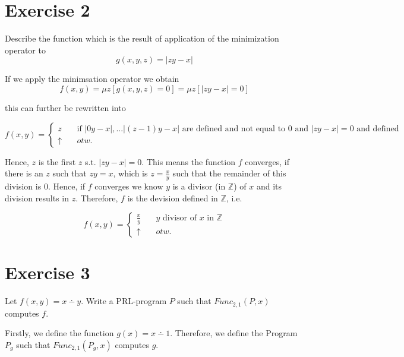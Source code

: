 \documentclass[11pt,a4paper]{article}
\begin{document}
\section*{Exercise 2}
Describe the function which is the result of application of the minimization operator to
\begin{equation*}
g(x,y,z) = |zy-x|
\end{equation*}

If we apply the minimsation operator we obtain
\begin{equation*}
f(x,y)= \mu z [g(x,y,z) = 0] = \mu z [|zy-x| = 0]
\end{equation*}

this can further be rewritten into 

\begin{equation*}
f(x,y)=
\begin{cases}
   z  & \quad  \text{if } |0y-x|,...|(z-1)y-x| \text{ are defined and not equal to } 0 \text{ and } |zy-x|=0 \text{ and defined }       \\
   \uparrow  & \quad  otw.
 \end{cases}
\end{equation*}

Hence, $z$ is the first $z$ s.t. $|zy-x|=0$. This means the function $f$ converges, if there is an $z$ such that $zy=x$,
which is $z = \frac{x}{y}$ such that the remainder of this division is $0$. Hence, if $f$ converges we know $y$ is a divisor (in 	
$\mathbb{Z}$) of $x$ and its division results in $z$. Therefore,  $f$ is the devision defined in $\mathbb{Z}$, i.e.

\begin{equation*}
f(x,y)=
\begin{cases}
   \frac{x}{y}  & \quad  y \text{ divisor of } x  \text{ in } \mathbb{Z} \\
   \uparrow  & \quad otw.
 \end{cases}
\end{equation*}

\section*{Exercise 3}
Let $f(x,y) = x \dotminus y$. Write a PRL-program $P$ such that $Func_{2,1}(P,x)$ computes $f$.

\bigbreak

Firstly, we define the function $g(x)=x \dotminus 1$. Therefore, we define the Program $P_g$ such that  $Func_{2,1}(P_g,x)$ computes $g$.
\end{document}
